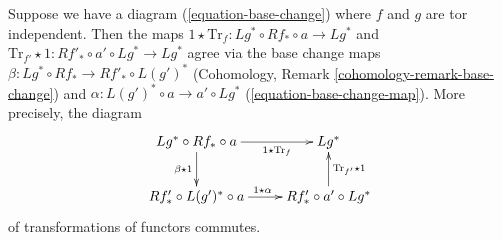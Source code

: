 \begin{lemma}
\label{lemma-trace-map-and-base-change}
Suppose we have a diagram (\ref{equation-base-change}) where $f$ and $g$
are tor independent. Then the maps
$1 \star \text{Tr}_f : Lg^* \circ Rf_* \circ a \to Lg^*$ and
$\text{Tr}_{f'} \star 1 : Rf'_* \circ a' \circ Lg^* \to Lg^*$
agree via the base change maps
$\beta : Lg^* \circ Rf_* \to Rf'_* \circ L(g')^*$
(Cohomology, Remark \ref{cohomology-remark-base-change})
and $\alpha : L(g')^* \circ a \to a' \circ Lg^*$
(\ref{equation-base-change-map}).
More precisely, the diagram
$$
\xymatrix{
Lg^* \circ Rf_* \circ a
\ar[d]_{\beta \star 1} \ar[r]_-{1 \star \text{Tr}_f} &
Lg^* \\
Rf'_* \circ L(g')^* \circ a \ar[r]^{1 \star \alpha} &
Rf'_* \circ a' \circ Lg^* \ar[u]_{\text{Tr}_{f'} \star 1}
}
$$
of transformations of functors commutes.
\end{lemma}

